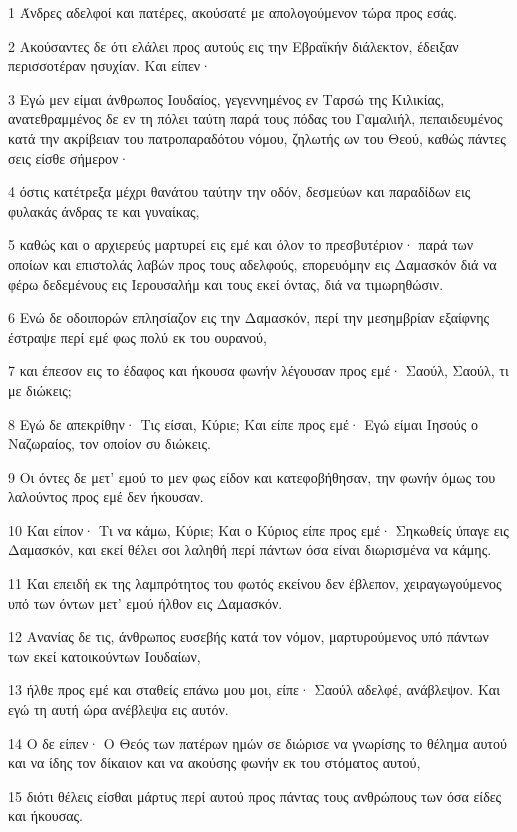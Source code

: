 \par 1 Άνδρες αδελφοί και πατέρες, ακούσατέ με απολογούμενον τώρα προς εσάς.
\par 2 Ακούσαντες δε ότι ελάλει προς αυτούς εις την Εβραϊκήν διάλεκτον, έδειξαν περισσοτέραν ησυχίαν. Και είπεν·
\par 3 Εγώ μεν είμαι άνθρωπος Ιουδαίος, γεγεννημένος εν Ταρσώ της Κιλικίας, ανατεθραμμένος δε εν τη πόλει ταύτη παρά τους πόδας του Γαμαλιήλ, πεπαιδευμένος κατά την ακρίβειαν του πατροπαραδότου νόμου, ζηλωτής ων του Θεού, καθώς πάντες σεις είσθε σήμερον·
\par 4 όστις κατέτρεξα μέχρι θανάτου ταύτην την οδόν, δεσμεύων και παραδίδων εις φυλακάς άνδρας τε και γυναίκας,
\par 5 καθώς και ο αρχιερεύς μαρτυρεί εις εμέ και όλον το πρεσβυτέριον· παρά των οποίων και επιστολάς λαβών προς τους αδελφούς, επορευόμην εις Δαμασκόν διά να φέρω δεδεμένους εις Ιερουσαλήμ και τους εκεί όντας, διά να τιμωρηθώσιν.
\par 6 Ενώ δε οδοιπορών επλησίαζον εις την Δαμασκόν, περί την μεσημβρίαν εξαίφνης έστραψε περί εμέ φως πολύ εκ του ουρανού,
\par 7 και έπεσον εις το έδαφος και ήκουσα φωνήν λέγουσαν προς εμέ· Σαούλ, Σαούλ, τι με διώκεις;
\par 8 Εγώ δε απεκρίθην· Τις είσαι, Κύριε; Και είπε προς εμέ· Εγώ είμαι Ιησούς ο Ναζωραίος, τον οποίον συ διώκεις.
\par 9 Οι όντες δε μετ' εμού το μεν φως είδον και κατεφοβήθησαν, την φωνήν όμως του λαλούντος προς εμέ δεν ήκουσαν.
\par 10 Και είπον· Τι να κάμω, Κύριε; Και ο Κύριος είπε προς εμέ· Σηκωθείς ύπαγε εις Δαμασκόν, και εκεί θέλει σοι λαληθή περί πάντων όσα είναι διωρισμένα να κάμης.
\par 11 Και επειδή εκ της λαμπρότητος του φωτός εκείνου δεν έβλεπον, χειραγωγούμενος υπό των όντων μετ' εμού ήλθον εις Δαμασκόν.
\par 12 Ανανίας δε τις, άνθρωπος ευσεβής κατά τον νόμον, μαρτυρούμενος υπό πάντων των εκεί κατοικούντων Ιουδαίων,
\par 13 ήλθε προς εμέ και σταθείς επάνω μου μοι, είπε· Σαούλ αδελφέ, ανάβλεψον. Και εγώ τη αυτή ώρα ανέβλεψα εις αυτόν.
\par 14 Ο δε είπεν· Ο Θεός των πατέρων ημών σε διώρισε να γνωρίσης το θέλημα αυτού και να ίδης τον δίκαιον και να ακούσης φωνήν εκ του στόματος αυτού,
\par 15 διότι θέλεις είσθαι μάρτυς περί αυτού προς πάντας τους ανθρώπους των όσα είδες και ήκουσας.
